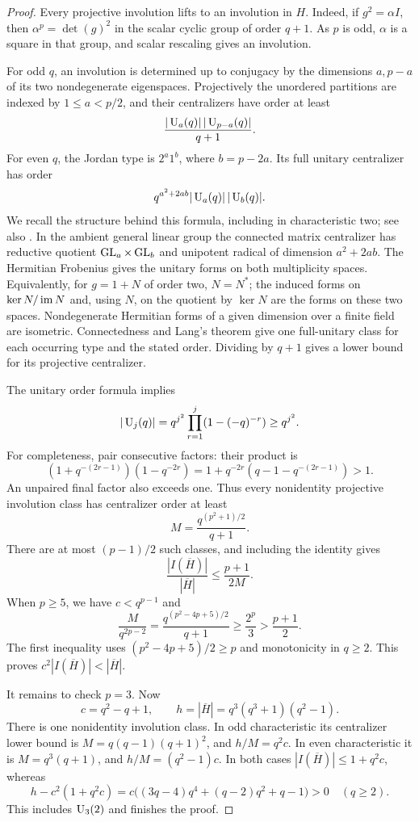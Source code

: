 \begin{proof}
Every projective involution lifts to an involution in $H$. Indeed,
if $g^2=\alpha I$, then $\alpha^p=\det(g)^2$ in the scalar cyclic
group of order $q+1$. As $p$ is odd, $\alpha$ is a square in that
group, and scalar rescaling gives an involution.

For odd $q$, an involution is determined up to conjugacy by the
dimensions $a,p-a$ of its two nondegenerate eigenspaces. Projectively
the unordered partitions are indexed by $1\le a<p/2$, and their
centralizers have order at least
\begin{equation}\label{fg:unitary-odd-centralizer}
 \frac{|\operatorname{U}_a(q)|\,|\operatorname{U}_{p-a}(q)|}{q+1}.
\end{equation}
For even $q$, the Jordan type is $2^a1^b$, where $b=p-2a$. Its full
unitary centralizer has order
\begin{equation}\label{fg:unitary-even-centralizer}
 q^{a^2+2ab}|\operatorname{U}_a(q)|\,|\operatorname{U}_b(q)|.
\end{equation}
We recall the structure behind this formula, including in characteristic
two; see also \cite[Section~2.6, Case~(A)(ii),(iv), pp.~34--36]{Wall1963}.
In the ambient general
linear group the connected matrix centralizer has reductive quotient
$\operatorname{GL}_a\times\operatorname{GL}_b$ and unipotent radical of dimension $a^2+2ab$.
The Hermitian Frobenius gives the unitary forms on both multiplicity
spaces. Equivalently, for $g=1+N$ of order two, $N=N^*$; the induced
forms on $\ker N/\operatorname{im} N$ and, using $N$, on the quotient by $\ker N$
are the forms on these two spaces. Nondegenerate Hermitian forms of
a given dimension over a finite field are isometric. Connectedness
and Lang's theorem give one full-unitary class for each occurring
type and the stated order. Dividing by $q+1$ gives a lower bound
for its projective centralizer.

The unitary order formula implies
\begin{equation}\label{fg:unitary-order-lower}
 |\operatorname{U}_j(q)|=q^{j^2}\prod_{r=1}^j(1-(-q)^{-r})\ge q^{j^2}.
\end{equation}
For completeness, pair consecutive factors: their product is
\[
 (1+q^{-(2r-1)})(1-q^{-2r})
 =1+q^{-2r}(q-1-q^{-(2r-1)})>1.
\]
An unpaired final factor also exceeds one. Thus every nonidentity
projective involution class has centralizer order at least
\[
 M=\frac{q^{(p^2+1)/2}}{q+1}.
\]
There are at most $(p-1)/2$ such classes, and including the identity
gives
\[
 \frac{|I(\overline H)|}{|\overline H|}\le\frac{p+1}{2M}.
\]
When $p\ge5$, we have $c<q^{p-1}$ and
\[
 \frac{M}{q^{2p-2}}
 =\frac{q^{(p^2-4p+5)/2}}{q+1}
 \ge\frac{2^p}{3}>\frac{p+1}{2}.
\]
The first inequality uses $(p^2-4p+5)/2\ge p$ and monotonicity in
$q\ge2$. This proves $c^2|I(\overline H)|<|\overline H|$.

It remains to check $p=3$. Now
\[
 c=q^2-q+1,\qquad h=|\overline H|=q^3(q^3+1)(q^2-1).
\]
There is one nonidentity involution class. In odd characteristic its
centralizer lower bound is $M=q(q-1)(q+1)^2$, and $h/M=q^2c$.
In even characteristic it is $M=q^3(q+1)$, and $h/M=(q^2-1)c$.
In both cases $|I(\overline H)|\le1+q^2c$, whereas
\[
 h-c^2(1+q^2c)
 =c\bigl((3q-4)q^4+(q-2)q^2+q-1\bigr)>0
 \quad(q\ge2).
\]
This includes $\operatorname{U}_3(2)$ and finishes the proof.
\end{proof}

